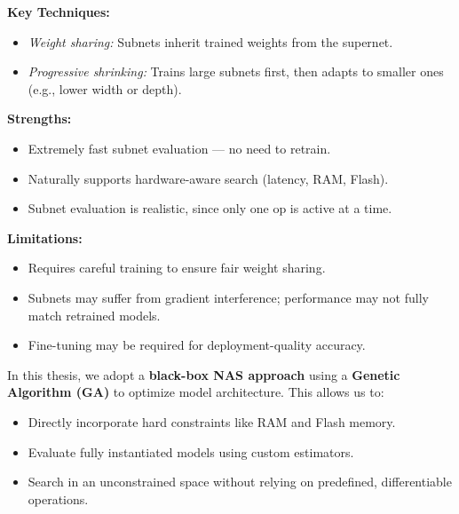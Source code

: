 \textbf{Key Techniques:}
\begin{itemize}
    \item \textit{Weight sharing:} Subnets inherit trained weights from the supernet.
    \item \textit{Progressive shrinking:} Trains large subnets first, then adapts to smaller ones (e.g., lower width or depth).
\end{itemize}

\textbf{Strengths:}
\begin{itemize}
    \item Extremely fast subnet evaluation — no need to retrain.
    \item Naturally supports hardware-aware search (latency, RAM, Flash).
    \item Subnet evaluation is realistic, since only one op is active at a time.
\end{itemize}

\textbf{Limitations:}
\begin{itemize}
    \item Requires careful training to ensure fair weight sharing.
    \item Subnets may suffer from gradient interference; performance may not fully match retrained models.
    \item Fine-tuning may be required for deployment-quality accuracy.
\end{itemize}


\begin{comment}
\subsection{Summary and Thesis Direction}
Black-box NAS offers maximum flexibility and supports arbitrary performance constraints, but suffers from high computational cost. DARTS introduces differentiability to reduce this cost but trades off flexibility and realism. Supernet-based methods strike a middle ground, enabling efficient and hardware-aware search through weight sharing and path sampling.
\end{comment}

\vspace{0.3em}
\noindent In this thesis, we adopt a \textbf{black-box NAS approach} using a \textbf{Genetic Algorithm (GA)} to optimize model architecture. This allows us to:
\begin{itemize}
    \item Directly incorporate hard constraints like RAM and Flash memory.
    \item Evaluate fully instantiated models using custom estimators.
    \item Search in an unconstrained space without relying on predefined, differentiable operations.
\end{itemize}

